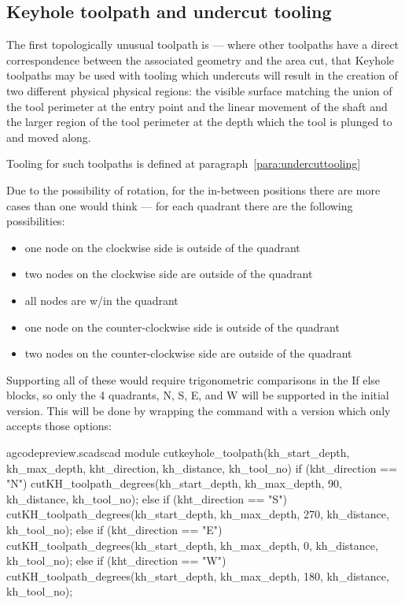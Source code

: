 \documentclass{ltxdoc}
\begin{document}
\subsection{Keyhole toolpath and undercut tooling}
 
\label{subsec:keyholetoolpaths}
The first topologically unusual toolpath is  --- where 
other toolpaths have a direct correspondence between the associated geometry and the area cut, 
that Keyhole toolpaths may be used with tooling which undercuts will result in the creation of 
two different physical physical regions: the visible surface matching the union of the tool
perimeter at the entry point and the linear movement of the shaft and the larger region of the 
tool perimeter at the depth which the tool is plunged to and moved along.
 
Tooling for such toolpaths is defined at paragraph~\ref{para:undercuttooling}

Due to the possibility of rotation, for the in-between positions there are more cases 
than one would think — for each quadrant there are the following possibilities:

\begin{itemize}
 \item one node on the clockwise side is outside of the quadrant
 \item two nodes on the clockwise side are outside of the quadrant
 \item all nodes are w/in the quadrant
 \item one node on the counter-clockwise side is outside of the quadrant
 \item two nodes on the counter-clockwise side are outside of the quadrant
\end{itemize}
 
Supporting all of these would require trigonometric comparisons in the If else blocks, 
so only the 4 quadrants, N, S, E, and W will be supported in the initial version. 
This will be done by wrapping the command with a version which only accepts those options: 

\lstset{firstnumber=\thegcpscad}
\begin{writecode}{a}{gcodepreview.scad}{scad}
module cutkeyhole_toolpath(kh_start_depth, kh_max_depth, kht_direction, kh_distance, kh_tool_no) {   
if (kht_direction == "N") {
  cutKH_toolpath_degrees(kh_start_depth, kh_max_depth, 90, kh_distance, kh_tool_no);
    } else if (kht_direction == "S") {
  cutKH_toolpath_degrees(kh_start_depth, kh_max_depth, 270, kh_distance, kh_tool_no);
    } else if (kht_direction == "E") {
  cutKH_toolpath_degrees(kh_start_depth, kh_max_depth, 0, kh_distance, kh_tool_no);
    } else if (kht_direction == "W") {
  cutKH_toolpath_degrees(kh_start_depth, kh_max_depth, 180, kh_distance, kh_tool_no);
    }
}

\end{writecode}
\addtocounter{gcpscad}{12}
 
\end{document}
